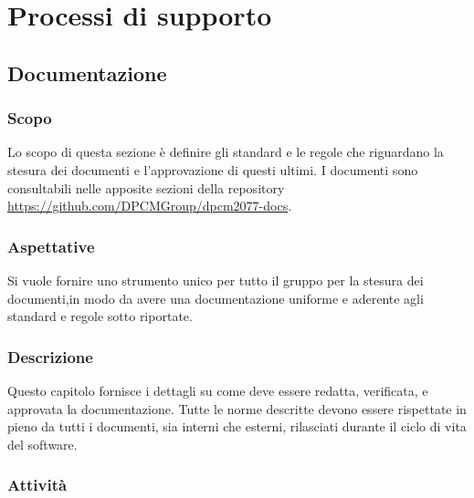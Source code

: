 \section{Processi di supporto}
	\subsection{Documentazione}
		\subsubsection{Scopo}
			Lo scopo di questa sezione è definire gli standard e le regole che riguardano la stesura dei documenti e l'approvazione di questi ultimi.
			I documenti sono consultabili nelle apposite sezioni della repository \url{https://github.com/DPCMGroup/dpcm2077-docs}.
		\subsubsection{Aspettative}
			Si vuole fornire uno strumento unico per tutto il gruppo per la stesura dei documenti,in modo da avere una documentazione uniforme e aderente agli standard e regole sotto riportate.
		\subsubsection{Descrizione}
			Questo capitolo fornisce i dettagli su come deve essere redatta, verificata, e approvata la documentazione. Tutte le norme descritte devono essere rispettate in pieno da tutti i documenti, sia interni che esterni, rilasciati durante il ciclo di vita del software.
		\subsubsection{Attività}
